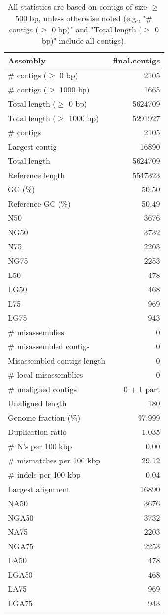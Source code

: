 \documentclass[12pt,a4paper]{article}
\begin{document}
\begin{table}[ht]
\begin{center}
\caption{All statistics are based on contigs of size $\geq$ 500 bp, unless otherwise noted (e.g., "\# contigs ($\geq$ 0 bp)" and "Total length ($\geq$ 0 bp)" include all contigs).}
\begin{tabular}{|l*{1}{|r}|}
\hline
Assembly & final.contigs \\ \hline
\# contigs ($\geq$ 0 bp) & 2105 \\ \hline
\# contigs ($\geq$ 1000 bp) & 1665 \\ \hline
Total length ($\geq$ 0 bp) & 5624709 \\ \hline
Total length ($\geq$ 1000 bp) & 5291927 \\ \hline
\# contigs & 2105 \\ \hline
Largest contig & 16890 \\ \hline
Total length & 5624709 \\ \hline
Reference length & 5547323 \\ \hline
GC (\%) & 50.50 \\ \hline
Reference GC (\%) & 50.49 \\ \hline
N50 & 3676 \\ \hline
NG50 & 3732 \\ \hline
N75 & 2203 \\ \hline
NG75 & 2253 \\ \hline
L50 & 478 \\ \hline
LG50 & 468 \\ \hline
L75 & 969 \\ \hline
LG75 & 943 \\ \hline
\# misassemblies & 0 \\ \hline
\# misassembled contigs & 0 \\ \hline
Misassembled contigs length & 0 \\ \hline
\# local misassemblies & 0 \\ \hline
\# unaligned contigs & 0 + 1 part \\ \hline
Unaligned length & 180 \\ \hline
Genome fraction (\%) & 97.999 \\ \hline
Duplication ratio & 1.035 \\ \hline
\# N's per 100 kbp & 0.00 \\ \hline
\# mismatches per 100 kbp & 29.12 \\ \hline
\# indels per 100 kbp & 0.04 \\ \hline
Largest alignment & 16890 \\ \hline
NA50 & 3676 \\ \hline
NGA50 & 3732 \\ \hline
NA75 & 2203 \\ \hline
NGA75 & 2253 \\ \hline
LA50 & 478 \\ \hline
LGA50 & 468 \\ \hline
LA75 & 969 \\ \hline
LGA75 & 943 \\ \hline
\end{tabular}
\end{center}
\end{table}
\end{document}
